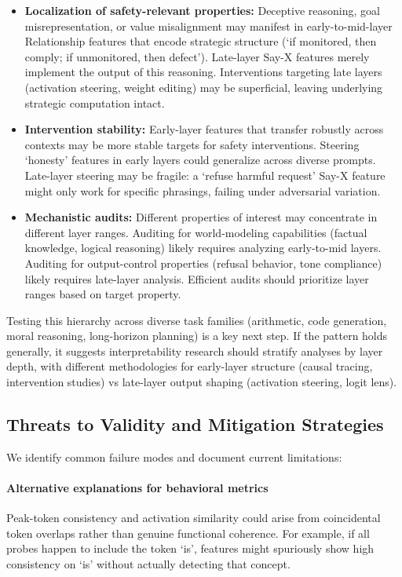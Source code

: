 \begin{itemize}
  \item \textbf{Localization of safety-relevant properties:} Deceptive reasoning, goal misrepresentation, or value misalignment may manifest in early-to-mid-layer Relationship features that encode strategic structure (`if monitored, then comply; if unmonitored, then defect'). Late-layer Say-X features merely implement the output of this reasoning. Interventions targeting late layers (activation steering, weight editing) may be superficial, leaving underlying strategic computation intact.
  
  \item \textbf{Intervention stability:} Early-layer features that transfer robustly across contexts may be more stable targets for safety interventions. Steering `honesty' features in early layers could generalize across diverse prompts. Late-layer steering may be fragile: a `refuse harmful request' Say-X feature might only work for specific phrasings, failing under adversarial variation.
  
  \item \textbf{Mechanistic audits:} Different properties of interest may concentrate in different layer ranges. Auditing for world-modeling capabilities (factual knowledge, logical reasoning) likely requires analyzing early-to-mid layers. Auditing for output-control properties (refusal behavior, tone compliance) likely requires late-layer analysis. Efficient audits should prioritize layer ranges based on target property.
\end{itemize}

Testing this hierarchy across diverse task families (arithmetic, code generation, moral reasoning, long-horizon planning) is a key next step. If the pattern holds generally, it suggests interpretability research should stratify analyses by layer depth, with different methodologies for early-layer structure (causal tracing, intervention studies) vs late-layer output shaping (activation steering, logit lens).

\subsection{Threats to Validity and Mitigation Strategies}

We identify common failure modes and document current limitations:

\paragraph{Alternative explanations for behavioral metrics}
Peak-token consistency and activation similarity could arise from coincidental token overlaps rather than genuine functional coherence. For example, if all probes happen to include the token `is', features might spuriously show high consistency on `is' without actually detecting that concept.

